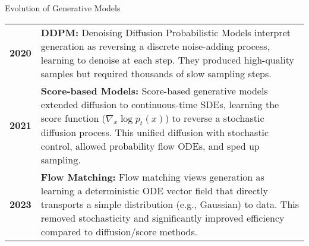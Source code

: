 \documentclass[aspectratio=169,xcolor=dvipsnames]{beamer}
\begin{document}
\begin{frame}{Evolution of Generative Models}
    \begin{center}
        \begin{minipage}{0.9\textwidth}
            \vspace{0.3cm}
            
            \small
            \begin{tabular}{@{}l@{\hspace{0.8cm}}p{}@{}}
                \textbf{2020} & \textbf{DDPM:} Denoising Diffusion Probabilistic Models interpret generation as reversing a discrete noise-adding process, learning to denoise at each step. They produced high-quality samples but required thousands of slow sampling steps. \\[0.4cm]
                
                \textbf{2021} & \textbf{Score-based Models:} Score-based generative models extended diffusion to continuous-time SDEs, learning the score function ($\nabla_x \log p_t(x)$) to reverse a stochastic diffusion process. This unified diffusion with stochastic control, allowed probability flow ODEs, and sped up sampling. \\[0.4cm]
                
                \textbf{2023} & \textbf{Flow Matching:} Flow matching views generation as learning a deterministic ODE vector field that directly transports a simple distribution (e.g., Gaussian) to data. This removed stochasticity and significantly improved efficiency compared to diffusion/score methods. \\[0.4cm]
            \end{tabular}
            
            \vspace{0.3cm}
        \end{minipage}
    \end{center}
\end{frame}
\end{document}
